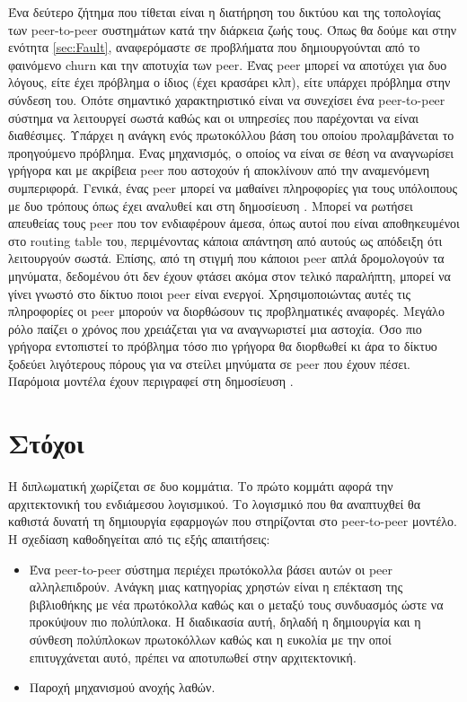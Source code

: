 Ένα δεύτερο ζήτημα που τίθεται είναι η διατήρηση του δικτύου και της 
τοπολογίας των peer-to-peer συστημάτων κατά την διάρκεια ζωής τους. Όπως 
θα δούμε και στην ενότητα \ref{sec:Fault}, αναφερόμαστε σε προβλήματα που 
δημιουργούνται από το φαινόμενο churn και την αποτυχία των peer. Ένας 
peer μπορεί να αποτύχει για δυο λόγους, είτε έχει πρόβλημα ο ίδιος (έχει 
κρασάρει κλπ), είτε υπάρχει πρόβλημα στην σύνδεση του. Οπότε σημαντικό 
χαρακτηριστικό είναι να συνεχίσει ένα peer-to-peer σύστημα να λειτουργεί 
σωστά καθώς και οι υπηρεσίες που παρέχονται να είναι διαθέσιμες. Υπάρχει 
η ανάγκη ενός πρωτοκόλλου βάση του οποίου προλαμβάνεται το προηγούμενο 
πρόβλημα. Ένας μηχανισμός, ο οποίος να είναι σε θέση να αναγνωρίσει 
γρήγορα και με ακρίβεια peer που αστοχούν ή αποκλίνουν από την 
αναμενόμενη συμπεριφορά. Γενικά, ένας peer μπορεί να μαθαίνει 
πληροφορίες για τους υπόλοιπους με δυο τρόπους όπως έχει αναλυθεί και 
στη δημοσίευση \citep{Stoica2005}. Μπορεί να ρωτήσει απευθείας τους peer 
που τον ενδιαφέρουν άμεσα, όπως αυτοί που είναι αποθηκευμένοι στο 
routing table του, περιμένοντας κάποια απάντηση από αυτούς ως απόδειξη 
ότι λειτουργούν σωστά. Επίσης, από τη στιγμή που κάποιοι peer απλά 
δρομολογούν τα μηνύματα, δεδομένου ότι δεν έχουν φτάσει ακόμα στον 
τελικό παραλήπτη, μπορεί να γίνει γνωστό στο δίκτυο ποιοι peer είναι 
ενεργοί. Χρησιμοποιώντας αυτές τις πληροφορίες οι peer μπορούν να 
διορθώσουν τις προβληματικές αναφορές. Μεγάλο ρόλο παίζει ο χρόνος που 
χρειάζεται για να αναγνωριστεί μια αστοχία. Όσο πιο γρήγορα εντοπιστεί 
το πρόβλημα τόσο πιο γρήγορα θα διορθωθεί κι άρα το δίκτυο ξοδεύει 
λιγότερους πόρους για να στείλει μηνύματα σε peer που έχουν πέσει. 
Παρόμοια μοντέλα έχουν περιγραφεί στη δημοσίευση \citep{Rodrigues2002}.

\section{Στόχοι}

Η διπλωματική χωρίζεται σε δυο κομμάτια. Το πρώτο κομμάτι αφορά την 
αρχιτεκτονική του ενδιάμεσου λογισμικού. Το λογισμικό που θα αναπτυχθεί 
θα καθιστά δυνατή τη δημιουργία εφαρμογών που στηρίζονται στο peer-to-peer 
μοντέλο. Η σχεδίαση καθοδηγείται από τις εξής απαιτήσεις:

\begin{itemize}
\item Ένα peer-to-peer σύστημα περιέχει πρωτόκολλα βάσει αυτών οι peer 
αλληλεπιδρούν. Ανάγκη μιας κατηγορίας χρηστών είναι η επέκταση της 
βιβλιοθήκης με νέα πρωτόκολλα καθώς και ο μεταξύ τους συνδυασμός ώστε να 
προκύψουν πιο πολύπλοκα. Η διαδικασία αυτή, δηλαδή η δημιουργία και η 
σύνθεση πολύπλοκων πρωτοκόλλων καθώς και η ευκολία με την οποί 
επιτυγχάνεται αυτό, πρέπει να αποτυπωθεί στην αρχιτεκτονική.
\item Παροχή μηχανισμού ανοχής λαθών.
\end{itemize}

